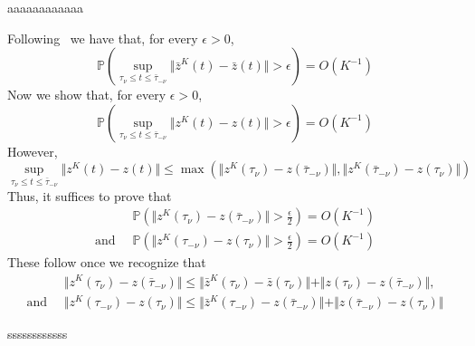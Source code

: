 \documentclass[10pt,journal,letterpaper]{IEEEtran}
\begin{document}
\begin{inparaenum}[(a)]
{aaaaaaaaaaaa


Following~\cite[Theorem~2.8]{stochproc.darling02fluid-limits} we have that, for every $\epsilon > 0$,
\[
\mathbb{P}\left(\sup_{\tau_{\nu} \leq t \leq \bar{\tau}_{-\nu}} \Vert
\bar{z}^K(t)- \bar{z}(t) \Vert > \epsilon \right) = O(K^{-1})
\]
Now we show that, for every $\epsilon > 0$,
\[
\mathbb{P}\left(\sup_{\tau_{\nu} \leq t \leq \bar{\tau}_{-\nu}} \Vert
z^K(t)- z(t) \Vert > \epsilon \right) = O(K^{-1})
\]
However,
\[
\sup_{\tau_{\nu} \leq t \leq \bar{\tau}_{-\nu}} \Vert z^K(t)- z(t) \Vert \leq
\max \left(\Vert z^K(\tau_{\nu})- z(\bar{\tau}_{-\nu}) \Vert,  \Vert z^K(\bar{\tau}_{-\nu})- z(\tau_{\nu}) \Vert \right)
\]
Thus, it suffices to prove that
\begin{align*}
&~\mathbb{P}\left(\Vert z^K(\tau_{\nu})- z(\bar{\tau}_{-\nu}) \Vert > \frac{\epsilon}{2} \right) = O(K^{-1})\\
\mbox{and } &~\mathbb{P}\left(\Vert z^K(\tau_{-\nu})- z(\tau_{\nu}) \Vert > \frac{\epsilon}{2} \right) = O(K^{-1})
\end{align*}
These follow once we recognize that
\begin{align*}
&~\Vert z^K(\tau_{\nu})- z(\bar{\tau}_{-\nu}) \Vert \leq \Vert \bar{z}^K(\tau_{\nu})- \bar{z}(\tau_{\nu}) \Vert + \Vert z(\tau_{\nu})- z(\bar{\tau}_{-\nu}) \Vert,\\
\mbox{and } &~\Vert z^K(\tau_{-\nu})- z(\tau_{\nu}) \Vert \leq \Vert \bar{z}^K(\tau_{-\nu})- z(\bar{\tau}_{-\nu}) \Vert + \Vert z(\bar{\tau}_{-\nu})- z(\tau_{\nu}) \Vert
\end{align*}

ssssssssssss

}
\end{inparaenum}
\end{document}
